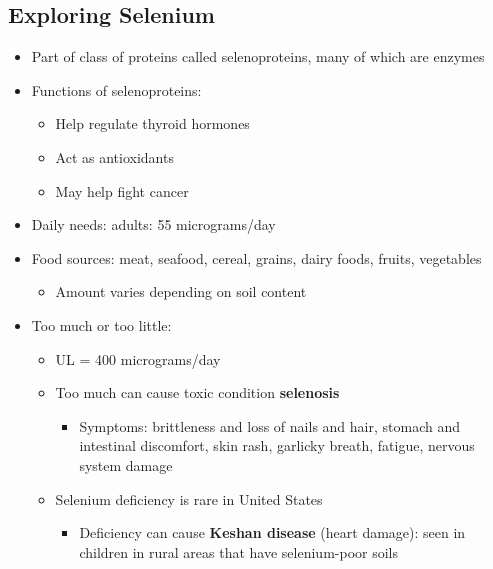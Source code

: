\documentclass[12pt]{article}
\begin{document}
        \subsection{Exploring Selenium}
            \begin{itemize}
                \item Part of class of proteins called selenoproteins, many of which are enzymes
                \item Functions of selenoproteins:
                    \begin{itemize}
                        \item Help regulate thyroid hormones
                        \item Act as antioxidants
                        \item May help fight cancer
                    \end{itemize}
                \item Daily needs: adults: 55 micrograms/day
                \item Food sources: meat, seafood, cereal, grains, dairy foods, fruits, vegetables
                    \begin{itemize}
                        \item Amount varies depending on soil content
                    \end{itemize}
                \item Too much or too little:
                    \begin{itemize}
                        \item UL = 400 micrograms/day
                        \item Too much can cause toxic condition \textbf{selenosis}
                            \begin{itemize}
                                \item Symptoms: brittleness and loss of nails and hair, stomach and intestinal discomfort, skin rash, garlicky breath, fatigue, nervous system damage
                            \end{itemize}
                        \item Selenium deficiency is rare in United States
                            \begin{itemize}
                                \item Deficiency can cause \textbf{Keshan disease} (heart damage): seen in children in rural areas that have selenium-poor soils
                            \end{itemize}
                    \end{itemize}
            \end{itemize}
\end{document}
